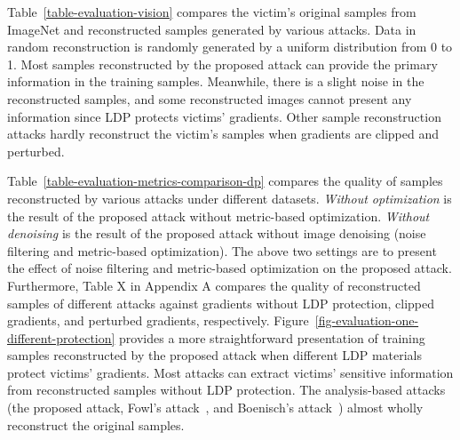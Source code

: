 \documentclass[lettersize,journal]{IEEEtran}
\begin{document}
Table~\ref{table-evaluation-vision} compares the victim's original samples from ImageNet and reconstructed samples generated by various attacks. Data in random reconstruction is randomly generated by a uniform distribution from 0 to 1. Most samples reconstructed by the proposed attack can provide the primary information in the training samples.  Meanwhile, there is a slight noise in the reconstructed samples, and some reconstructed images cannot present any information since LDP protects victims' gradients. Other sample reconstruction attacks hardly reconstruct the victim's samples when gradients are clipped and perturbed.

Table~\ref{table-evaluation-metrics-comparison-dp} compares the quality of samples reconstructed by various attacks under different datasets. \textit{Without optimization} is the result of the proposed attack without metric-based optimization. \textit{Without denoising} is the result of the proposed attack without image denoising (noise filtering and metric-based optimization). The above two settings are to present the effect of noise filtering and metric-based optimization on the proposed attack. 
Furthermore, Table $\mathrm{X}$ in Appendix A compares the quality of reconstructed samples of different attacks against gradients without LDP protection, clipped gradients, and perturbed gradients, respectively.
Figure~\ref{fig-evaluation-one-different-protection} provides a more straightforward presentation of training samples reconstructed by the proposed attack when different LDP materials protect victims' gradients. Most attacks can extract victims' sensitive information from reconstructed samples without LDP protection. The analysis-based attacks (the proposed attack, Fowl's attack~\cite{fowl2022robbing}, and Boenisch's attack~\cite{Boenisch2021When}) almost wholly reconstruct the original samples.
\end{document}
